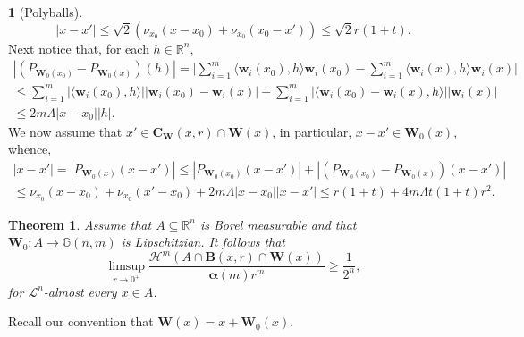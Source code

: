 \documentclass[11pt]{article}
\newcounter{cdrthm}[section]
\newtheorem{theorem}[cdrthm]{Theorem}
\theoremstyle{definition}
\theoremstyle{jepanonymous}
\newtheorem{jepempty}[cdrthm]{}
\newenvironment{enonce}[2][remark]{\begin{jepempty}[#2]}{\end{jepempty}}
\theoremstyle{plain}
\newenvironment{Empty}[2][\null]{%
\begin{enonce}[remark]{#1}#2}
{\end{enonce}}
\newcommand{\R}{\mathbb{R}}
\newcommand{\Rn}{\R^n}
\newcommand{\calH}{\mathscr{H}}
\newcommand{\calL}{\mathscr{L}}
\newcommand{\balpha}{\boldsymbol{\alpha}}
\newcommand{\bB}{{\boldsymbol{B}}}
\newcommand{\bC}{{\boldsymbol{C}}}
\newcommand{\bW}{{\boldsymbol{W}}}
\newcommand{\bw}{{\boldsymbol{w}}}
\newcommand{\bG}{\mathbb{G}}
\let\la\langle
\let\ra\rangle
\let\subset\subseteq
\begin{document}
\begin{Empty}[Polyballs]
\[
|x-x'| \leq \sqrt{2} \left(\nu_{x_0}(x-x_0) + \nu_{x_0}(x_0-x') \right) \leq \sqrt{2} r (1+t).
\]
Next notice that, for each $h \in \Rn$,
\begin{multline*}
\left| \left(P_{\bW_0(x_0)} - P_{\bW_0(x)} \right) (h) \right| = \biggl| \sum_{i=1}^m \la \bw_i(x_0), h \ra \bw_i(x_0) - \sum_{i=1}^m \la \bw_i(x), h \ra \bw_i(x)\biggr| \\
\leq \sum_{i=1}^m \left| \la \bw_i(x_0),h \ra \right| \left| \bw_i(x_0) - \bw_i(x) \right| + \sum_{i=1}^m \left| \la \bw_i(x_0) - \bw_i(x), h \ra \right| \left| \bw_i(x) \right| \\
\leq 2 m \Lambda \left| x-x_0 \right| |h|.
\end{multline*}
We now assume that $x' \in \bC_\bW(x,r) \cap \bW(x)$, in particular, $x-x' \in \bW_0(x)$, whence,
\begin{multline*}
\left| x-x' \right| = \left| P_{\bW_0(x)}(x-x')\right| \leq \left| P_{\bW_0(x_0)}(x-x')\right| + \left| \left(P_{\bW_0(x_0)} - P_{\bW_0(x)}\right)(x-x')\right| \\
\leq \nu_{x_0}(x-x_0) + \nu_{x_0}(x'-x_0) + 2 m \Lambda |x-x_0| |x-x'| \leq r(1+t) + 4m \Lambda t(1+t) r^2.
\end{multline*}
\end{Empty}

\begin{theorem}
\label{main.density}
Assume that $A \subset \Rn$ is Borel measurable and that $\bW_0: A \to \bG(n,m)$ is Lipschitzian.
It follows that
\begin{equation*}
\limsup_{r \to 0^+} \frac{\calH^m\left(A \cap \bB(x,r) \cap \bW(x)\right)}{\balpha(m)r^m} \geq \frac{1}{2^n},
\end{equation*}
for $\calL^n$-almost every $x \in A$.
\end{theorem}

Recall our convention that $\bW(x) = x + \bW_0(x)$.
\end{document}
